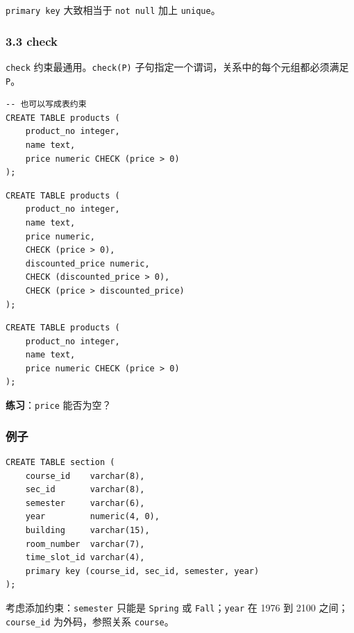 \documentclass[aspectratio=169, 14pt]{beamer}
\begin{document}
{
\begin{frame}[standout]
  \texttt{primary key} 大致相当于 \texttt{not null} 加上 \texttt{unique}。
\end{frame}
}

\begin{frame}[fragile]
    \frametitle{3.3 check}
\texttt{check} 约束最通用。\texttt{check(P)} 子句指定一个谓词，关系中的每个元组都必须满足 \texttt{P}。

\begin{verbatim}
-- 也可以写成表约束
CREATE TABLE products (
    product_no integer,
    name text,
    price numeric CHECK (price > 0)
);
\end{verbatim}

\end{frame}

\begin{frame}[fragile]

    \begin{verbatim}
CREATE TABLE products (
    product_no integer,
    name text,
    price numeric,
    CHECK (price > 0),
    discounted_price numeric,
    CHECK (discounted_price > 0),
    CHECK (price > discounted_price)
);
    \end{verbatim}
\end{frame}

\begin{frame}[fragile]
    \begin{verbatim}
CREATE TABLE products (
    product_no integer,
    name text,
    price numeric CHECK (price > 0)
);
    \end{verbatim}
    {\large {}}  \textbf{练习}：\texttt{price} 能否为空？

\pause


\end{frame}

\begin{frame}[fragile]
    \frametitle{例子}

\begin{verbatim}
CREATE TABLE section (
    course_id    varchar(8),
    sec_id       varchar(8),
    semester     varchar(6),
    year         numeric(4, 0),
    building     varchar(15),
    room_number  varchar(7),
    time_slot_id varchar(4),
    primary key (course_id, sec_id, semester, year)
);
\end{verbatim}
    
考虑添加约束：\texttt{semester} 只能是 \texttt{Spring} 或 \texttt{Fall}；\texttt{year} 在 1976 到 2100 之间；\texttt{course\_id} 为外码，参照关系 \texttt{course}。
\end{frame}
\end{document}
